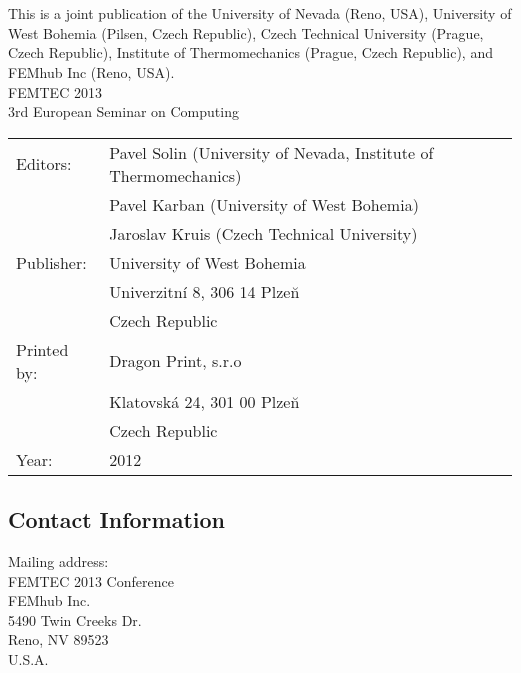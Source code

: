 \documentclass[article,A4,11pt]{llncs}%
\newcommand\BackgroundPic{
\put(0,0){
\parbox[b][\paperheight]{\paperwidth}{%
\vfill
\centering
\vfill
}}}
\begin{document}

\vbox{}
\pagestyle{empty}

\newpage

\textwidth=15.5cm


\newpage

\section*{}%

\vspace*{60mm}
This is a joint publication of the University of Nevada (Reno, USA),
University of West Bohemia (Pilsen, Czech Republic),
Czech Technical University (Prague, Czech Republic),
Institute of Thermomechanics (Prague, Czech Republic), and
FEMhub Inc (Reno, USA).\\

\noindent
FEMTEC 2013 \\
3rd European Seminar on Computing\\

\noindent
\begin{tabular}{ll}
Editors: & Pavel Solin (University of Nevada, Institute of Thermomechanics) \\
 & Pavel Karban (University of West Bohemia) \\
 & Jaroslav Kruis (Czech Technical University) \\
Publisher: & University of West Bohemia \\
 & Univerzitn\'{i} 8, 306 14 Plze\u{n}\\
 & Czech Republic\\
Printed by: & Dragon Print, s.r.o \\
 & Klatovsk\'{a} 24, 301 00 Plze\u{n}\\
 & Czech Republic\\
Year: & 2012\\
\end{tabular}

\subsection*{Contact Information}

Mailing address:\\
FEMTEC 2013 Conference\\
FEMhub Inc.\\
5490 Twin Creeks Dr.\\
Reno, NV 89523\\
U.S.A.
\end{document}

